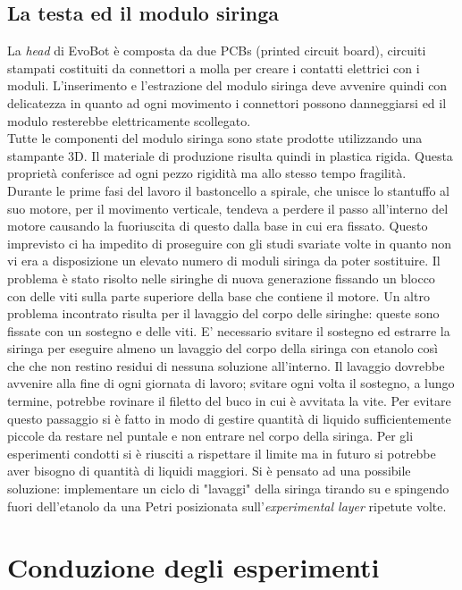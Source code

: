 \subsection{La testa ed il modulo siringa}
La \emph{head} di EvoBot è composta da due PCBs (printed circuit board), circuiti stampati costituiti da connettori a molla per creare i contatti elettrici con i moduli. L'inserimento e l'estrazione del modulo siringa deve avvenire quindi con delicatezza in quanto ad ogni movimento i connettori possono danneggiarsi ed il modulo resterebbe elettricamente scollegato.
\\Tutte le componenti del modulo siringa sono state prodotte utilizzando una stampante 3D. Il materiale di produzione risulta quindi in plastica rigida. Questa proprietà conferisce ad ogni pezzo rigidità ma allo stesso tempo fragilità.
\\Durante le prime fasi del lavoro il bastoncello a spirale, che unisce lo stantuffo al suo motore, per il movimento verticale, tendeva a perdere il passo all'interno del motore causando la fuoriuscita di questo dalla base in cui era fissato. Questo imprevisto ci ha impedito di proseguire con gli studi svariate volte in quanto non vi era a disposizione un elevato numero di moduli siringa da poter sostituire. Il problema è stato risolto nelle siringhe di nuova generazione fissando un blocco con delle viti sulla parte superiore della base che contiene il motore. 
Un altro problema incontrato risulta per il lavaggio del corpo delle siringhe: queste sono fissate con un sostegno e delle viti. E' necessario svitare il sostegno ed estrarre la siringa per eseguire almeno un lavaggio del corpo della siringa con etanolo così che che non restino residui di nessuna soluzione all'interno. Il lavaggio dovrebbe avvenire alla fine di ogni giornata di lavoro; svitare ogni volta il sostegno, a lungo termine, potrebbe rovinare il filetto del buco in cui è avvitata la vite. Per evitare questo passaggio si è fatto in modo di gestire quantità di liquido sufficientemente piccole da restare nel puntale e non entrare nel corpo della siringa. Per gli esperimenti condotti si è riusciti a rispettare il limite ma in futuro si potrebbe aver bisogno di quantità di liquidi maggiori. Si è pensato ad una possibile soluzione: implementare un ciclo di "lavaggi" della siringa tirando su e spingendo fuori dell'etanolo da una Petri posizionata sull'\emph{experimental layer} ripetute volte. 


\section{Conduzione degli esperimenti}
\label{sec:123}

